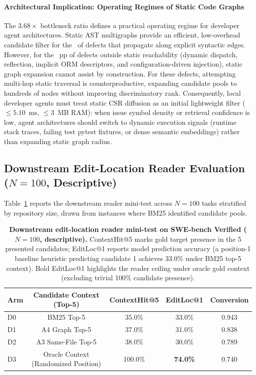 \documentclass[10pt]{article}
\begin{document}
\paragraph{Architectural Implication: Operating Regimes of Static Code Graphs}
The $3.68\times$ bottleneck ratio defines a practical operating regime for developer agent architectures. Static AST multigraphs provide an efficient, low-overhead candidate filter for the \RerankPoolOracleRecall\ of defects that propagate along explicit syntactic edges. However, for the \RerankBoundaryLossPP~pp of defects outside static reachability (dynamic dispatch, reflection, implicit ORM descriptors, and configuration-driven injection), static graph expansion cannot assist by construction. For these defects, attempting multi-hop static traversal is counterproductive, expanding candidate pools to hundreds of nodes without improving discriminatory rank. Consequently, local developer agents must treat static CSR diffusion as an initial lightweight filter ($\le 5.10$~ms, $\le 3$~MB RAM): when issue symbol density or retrieval confidence is low, agent architectures should switch to dynamic execution signals (runtime stack traces, failing test pytest fixtures, or dense semantic embeddings) rather than expanding static graph radius.

\subsection{Downstream Edit-Location Reader Evaluation ($N=100$, Descriptive)}
Table~\ref{tab:reader_mini_test_app} reports the downstream reader mini-test across $N=100$ tasks stratified by repository size, drawn from instances where BM25 identified candidate pools.

\begin{table}[!htbp]
\centering
\footnotesize
\setlength{\tabcolsep}{4.5pt}
\renewcommand{\arraystretch}{0.92}
\caption{\textbf{Downstream edit-location reader mini-test on SWE-bench Verified ($N=100$, descriptive).} ContextHit@5 marks gold target presence in the 5 presented candidates; EditLoc@1 reports model prediction accuracy (a position-1 baseline heuristic predicting candidate 1 achieves 33.0\% under BM25 top-5 context). Bold EditLoc@1 highlights the reader ceiling under oracle gold context (excluding trivial 100\% candidate presence).}
\label{tab:reader_mini_test_app}
\begin{tabular}{lcccc}
\toprule
\textbf{Arm} & \textbf{Candidate Context (Top-5)} & \textbf{ContextHit@5} & \textbf{EditLoc@1} & \textbf{Conversion} \\
\midrule
D0 & BM25 Top-5 & 35.0\% & 33.0\% & 0.943 \\
D1 & A4 Graph Top-5 & 37.0\% & 31.0\% & 0.838 \\
D2 & A3 Same-File Top-5 & 38.0\% & 30.0\% & 0.789 \\
D3 & Oracle Context (Randomized Position) & 100.0\% & \textbf{74.0\%} & 0.740 \\
\bottomrule
\end{tabular}
\end{table}
\end{document}
